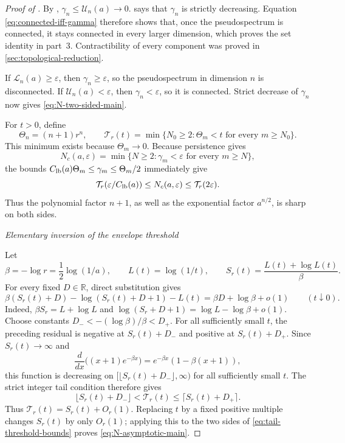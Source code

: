 \documentclass[a4paper,preprint,12pt,nopreprintline,sort&compress]{elsarticle}
\numberwithin{equation}{section}
\theoremstyle{remark}
\newcommand{\proofstage}[1]{%
  \par\medskip\noindent\textit{#1}\par\nobreak\smallskip}
\begin{document}
\begin{proof}[Proof of ]
By ,
\(\gamma_n\leq\mathcal U_n(a)\to0\).   says that
\(\gamma_n\) is strictly decreasing.  Equation
\eqref{eq:connected-iff-gamma} therefore shows that, once the
pseudospectrum is connected, it stays connected in every larger
dimension, which proves the set identity in part~3.  Contractibility of
every component was proved in \cref{sec:topological-reduction}.

If \(\mathcal L_n(a)\geq\varepsilon\), then
\(\gamma_n\geq\varepsilon\), so the pseudospectrum in dimension \(n\)
is disconnected.  If \(\mathcal U_n(a)<\varepsilon\), then
\(\gamma_n<\varepsilon\), so it is connected.  Strict decrease of
\(\gamma_n\) now gives \eqref{eq:N-two-sided-main}.

For \(t>0\), define
\[
 \Theta_n=(n+1)r^n,\qquad
 \mathcal T_r(t)=\min\{N_0\geq2:\Theta_m<t
 \text{ for every }m\geq N_0\}.
\]
This minimum exists because \(\Theta_m\to0\).
Because persistence gives
\[
 N_c(a,\varepsilon)=
 \min\{N\geq2:\gamma_m<\varepsilon\text{ for every }m\geq N\},
\]
the bounds \(C_{\rm lb}(a)\Theta_m\leq\gamma_m\leq\Theta_m/2\)
immediately give
\begin{equation}\label{eq:tail-threshold-bounds}
 \mathcal T_r(\varepsilon/C_{\rm lb}(a))\leq N_c(a,\varepsilon)
 \leq\mathcal T_r(2\varepsilon).
\end{equation}
Thus the polynomial factor \(n+1\), as well as the exponential factor
\(a^{n/2}\), is sharp on both sides.

\proofstage{Elementary inversion of the envelope threshold}
Let
\[
 \beta=-\log r=\frac12\log(1/a),\qquad
 L(t)=\log(1/t),\qquad
 S_r(t)=\frac{L(t)+\log L(t)}{\beta}.
\]
For every fixed \(D\in\mathbb R\), direct substitution gives
\[
 \beta(S_r(t)+D)-\log(S_r(t)+D+1)-L(t)
 =\beta D+\log\beta+o(1)
 \qquad(t\downarrow0).
\]
Indeed, \(\beta S_r=L+\log L\) and
\(\log(S_r+D+1)=\log L-\log\beta+o(1)\).
Choose constants \(D_-<-(\log\beta)/\beta<D_+\).  For all sufficiently
small \(t\), the preceding residual is negative at \(S_r(t)+D_-\) and
positive at \(S_r(t)+D_+\).  Since \(S_r(t)\to\infty\) and
\[
 \frac{d}{dx}\bigl((x+1)e^{-\beta x}\bigr)
 =e^{-\beta x}(1-\beta(x+1)),
\]
this function is decreasing on
\([\lfloor S_r(t)+D_-\rfloor,\infty)\) for all sufficiently small \(t\).
The strict integer tail condition therefore gives
\[
 \lfloor S_r(t)+D_-\rfloor<\mathcal T_r(t)
 \leq\lceil S_r(t)+D_+\rceil.
\]
Thus \(\mathcal T_r(t)=S_r(t)+O_r(1)\).  Replacing \(t\) by a fixed
positive multiple changes \(S_r(t)\) by only \(O_r(1)\); applying this to
the two sides of \eqref{eq:tail-threshold-bounds} proves
\eqref{eq:N-asymptotic-main}.


\end{proof}
\end{document}
